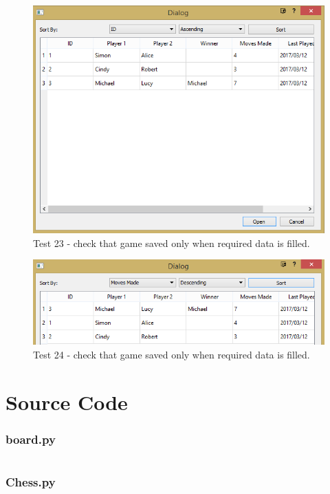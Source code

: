 \begin{figure}[H]
	\centering
	\includegraphics[width=1.0\textwidth]{images/screenshots/test-23}
	\caption{Test 23 - check that game saved only when required data is filled.}
	\label{test-23}
\end{figure}
\begin{figure}[H]
	\centering
	\includegraphics[width=1.0\textwidth]{images/screenshots/test-24}
	\caption{Test 24 - check that game saved only when required data is filled.}
	\label{test-24}
\end{figure}
\section{Source Code}
\subsubsection{board.py}
\begin{longlisting}
	\inputminted[breaklines, linenos, breakanywhere, tabsize=4, baselinestretch=1.0, fontsize=\footnotesize]{python}{../src/board.py}
\end{longlisting}
\subsubsection{Chess.py}
\begin{longlisting}
	\inputminted[breaklines, linenos, breakanywhere, tabsize=4, baselinestretch=1.0, fontsize=\footnotesize]{python}{../src/Chess.py}
\end{longlisting}

